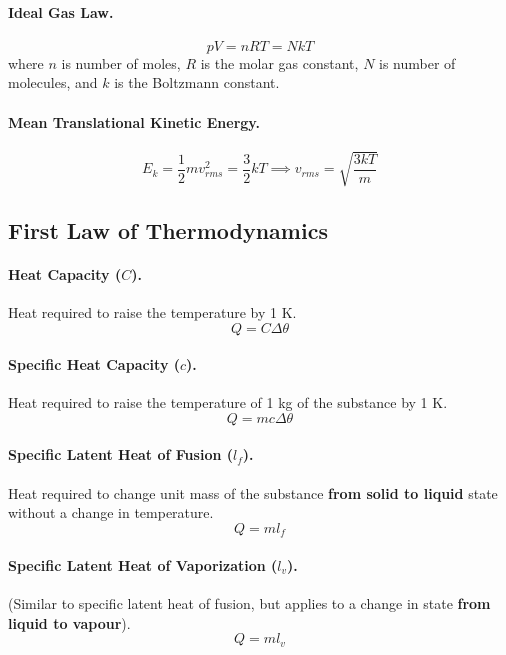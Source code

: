 \documentclass{article}
\begin{document}
\paragraph{Ideal Gas Law.} \begin{equation}
pV = nRT = NkT
\end{equation} where $n$ is number of moles, $R$ is the molar gas constant, $N$ is number of molecules, and $k$ is the Boltzmann constant.

\paragraph{Mean Translational Kinetic Energy.} \begin{equation}
E_k = \frac{1}{2}mv_{rms}^2 = \frac{3}{2}kT \implies v_{rms} = \sqrt{\frac{3kT}{m}}
\end{equation}

\subsection{First Law of Thermodynamics}

\paragraph{Heat Capacity ($C$).} Heat required to raise the temperature by 1 K. \begin{equation}
Q = C\Delta\theta
\end{equation}

\paragraph{Specific Heat Capacity ($c$).} Heat required to raise the temperature of 1 kg of the substance by 1 K. \begin{equation}
Q = mc\Delta\theta
\end{equation}

\paragraph{Specific Latent Heat of Fusion ($l_f$).} Heat required to change unit mass of the substance \textbf{from solid to liquid} state without a change in temperature. \begin{equation}
Q = ml_f
\end{equation}

\paragraph{Specific Latent Heat of Vaporization ($l_v$).} (Similar to specific latent heat of fusion, but applies to a change in state \textbf{from liquid to vapour}). \begin{equation}
Q = ml_v
\end{equation}
\end{document}
